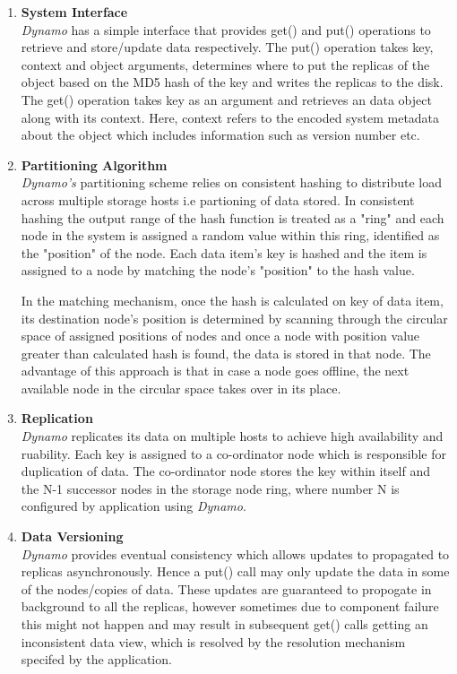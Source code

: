 \documentclass[12pt, a4paper]{article}
\begin{document}
\begin{enumerate}
\item \textbf{System Interface}\\
\textit{Dynamo}\cite{DeCandia:2007:DAH:1294261.1294281} has a simple interface that provides get() and put() operations to retrieve and store/update data respectively. The put() operation takes key, context and object arguments, determines where to put the replicas of the object based on the MD5 hash of the key and writes the replicas to the disk. The get() operation takes key as an argument and retrieves an data object along with its context. Here, context refers to the encoded system metadata about the object which includes information such as version number etc.

\item \textbf{Partitioning Algorithm}\\
\textit{Dynamo's} partitioning scheme relies on consistent hashing to distribute load across multiple storage hosts i.e partioning of data stored. In consistent hashing the output range of the hash function is treated as a "ring" and each node in the system is assigned a random value within this ring, identified as the "position" of the node. Each data item's key is hashed and the item is assigned to a node by matching the node's "position" to the hash value.\par

In the matching mechanism, once the hash is calculated on key of data item, its destination node's position is determined by scanning through the circular space of assigned positions of nodes and once a node with position value greater than calculated hash is found, the data is stored in that node. The advantage of this approach is that in case a node goes offline, the next available node in the circular space takes over in its place.

\item \textbf{Replication}\\
\textit{Dynamo}\cite{DeCandia:2007:DAH:1294261.1294281} replicates its data on multiple hosts to achieve high availability and ruability. Each key is assigned to a co-ordinator node which is responsible for duplication of data. The co-ordinator node stores the key within itself and the N-1 successor nodes in the storage node ring, where number N is configured by application using \textit{Dynamo}\cite{DeCandia:2007:DAH:1294261.1294281}.

\item \textbf{Data Versioning}\\
\textit{Dynamo}\cite{DeCandia:2007:DAH:1294261.1294281} provides eventual consistency which allows updates to propagated to replicas asynchronously. Hence a put() call may only update the data in some of the nodes/copies of data. These updates are guaranteed to propogate in background to all the replicas, however sometimes due to component failure this might not happen and may result in subsequent get() calls getting an inconsistent data view, which is resolved by the resolution mechanism specifed by the application.\par


\end{enumerate}
\end{document}
